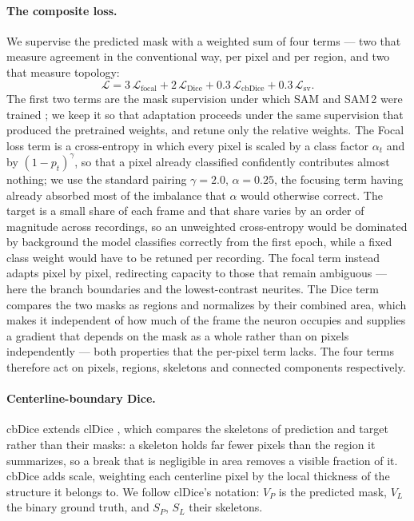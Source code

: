 \documentclass[11pt,a4paper]{article}
\begin{document}
\paragraph{The composite loss.}
We supervise the predicted mask with a weighted sum of four terms --- two
that measure agreement in the conventional way, per pixel and per region,
and two that measure topology:
\begin{equation}
\mathcal{L} = 3\,\mathcal{L}_{\text{focal}} + 2\,\mathcal{L}_{\text{Dice}}
 + 0.3\,\mathcal{L}_{\text{cbDice}} + 0.3\,\mathcal{L}_{\text{sv}} .
\label{eq:loss}
\end{equation}
The first two terms are the mask supervision under which SAM and SAM\,2 were
trained \cite{kirillov2023sam,ravi2025sam2}; we keep it so that adaptation
proceeds under the same supervision that produced the pretrained weights,
and retune only the relative weights. The Focal loss term
\cite{lin2017focal} is a cross-entropy in which every pixel is scaled by a
class factor $\alpha_t$ and by $(1-p_t)^{\gamma}$, so that a pixel already
classified confidently contributes almost nothing; we use the standard
pairing $\gamma = 2.0$, $\alpha = 0.25$, the focusing term having already
absorbed most of the imbalance that $\alpha$ would otherwise correct. The
target is a small share of each frame and that share varies by an order of
magnitude across recordings, so an unweighted cross-entropy would be
dominated by background the model classifies correctly from the first epoch,
while a fixed class weight would have to be retuned per recording. The focal
term instead adapts pixel by pixel, redirecting capacity to those that
remain ambiguous --- here the branch boundaries and the lowest-contrast
neurites. The Dice term \cite{milletari2016vnet} compares the two masks as
regions and normalizes by their combined area, which makes it independent of
how much of the frame the neuron occupies and supplies a gradient that
depends on the mask as a whole rather than on pixels independently --- both
properties that the per-pixel term lacks. The four terms therefore act on
pixels, regions, skeletons and connected components respectively.
\paragraph{Centerline-boundary Dice.}
cbDice \cite{shi2024cbdice} extends clDice \cite{shit2021cldice}, which
compares the skeletons of prediction and target rather than their masks: a
skeleton holds far fewer pixels than the region it summarizes, so a break
that is negligible in area removes a visible fraction of it. cbDice adds
scale, weighting each centerline pixel by the local thickness of the
structure it belongs to. We follow clDice's notation: $V_P$ is the predicted
mask, $V_L$ the binary ground truth, and $S_P$, $S_L$ their skeletons.
\end{document}
